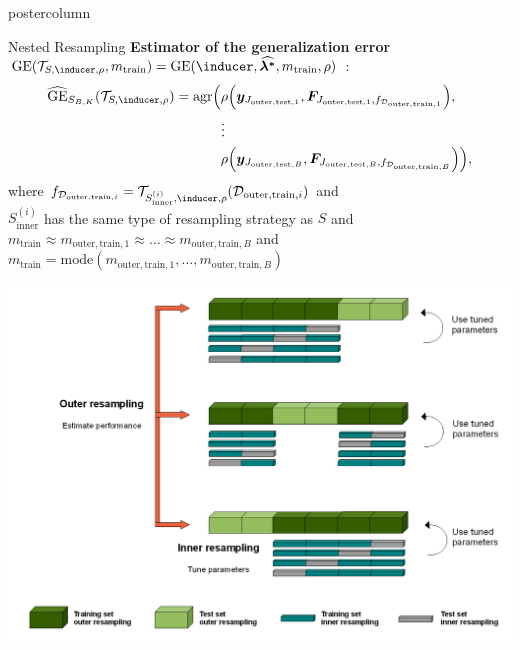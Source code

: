 \documentclass{beamer}
\begin{document}
\begin{frame}[fragile]{}
\begin{columns}
\begin{column}{.31\textwidth}
\begin{beamercolorbox}[center]{postercolumn}
\begin{minipage}{.98\textwidth}
{\begin{myblock}{Nested Resampling}
\textbf{Estimator of the generalization error} $\mathrm{GE}(\mathcal{T}_{S,\inducer,\rho}, m_\mathrm{train}) = \mathrm{GE}(\inducer, \boldsymbol{\widehat{\lambda^*}}, m_\mathrm{train}, \rho)$ :
\begin{equation*}
\begin{split}
\widehat{\mathrm{GE}}_{S_{B,K}}(\mathcal{T}_{S,\inducer,\rho}) = \mathrm{agr}\Big(
 &\rho\Big(\boldsymbol{y}_{J_{\mathrm{outer,test},1}}, \boldsymbol{F}_{J_{\mathrm{outer,test},1},f_{\mathcal{D}_{\mathrm{outer,train},1}}}\Big), \\ &\large{\vdots} \\
& \rho\Big(\boldsymbol{y}_{J_{\mathrm{outer,test},B}}, \boldsymbol{F}_{J_{\mathrm{outer,test},B},
f_{\mathcal{D}_{\mathrm{outer,train},B}}}\Big)
    \Big),
\end{split}
\end{equation*}
where $f_{\mathcal{D}_{\mathrm{outer,train},i}} = \mathcal{T}_{S_{\mathrm{inner}}^{(i)},\inducer,\rho}(\mathcal{D}_{\mathrm{outer,train},i})$ and \\
$S_{\mathrm{inner}}^{(i)}$ has the same type of resampling strategy as $S$ and \\
$m_{\mathrm{train}} \approx m_{\mathrm{outer,train},1} \approx \dots \approx m_{\mathrm{outer,train},B}$ and\\ $m_{\mathrm{train}} = \mathrm{mode}(m_{\mathrm{outer,train},1}, \dots, m_{\mathrm{outer,train},B})$\\

 \begin{center}
             \includegraphics[width=0.9\columnwidth]{img/tuning_2.PNG}
               \end{center}

\end{myblock}

			  }
			\end{minipage}
		\end{beamercolorbox}
	\end{column}
\end{columns}

\end{frame}
\end{document}
